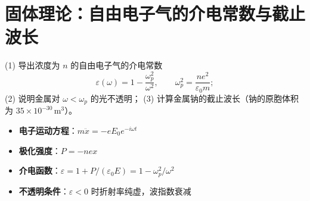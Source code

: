 \section{固体理论：自由电子气的介电常数与截止波长}
\label{sec:free-electron-dielectric}

\begin{modelbox}[题目：自由电子气介电函数与金属光学透明性]
(1) 导出浓度为 $n$ 的自由电子气的介电常数
\begin{equation}
\varepsilon(\omega)=1-\frac{\omega_p^2}{\omega^2},\qquad\omega_p^2=\frac{ne^2}{\varepsilon_0 m};
\end{equation}
(2) 说明金属对 $\omega<\omega_p$ 的光不透明；
(3) 计算金属钠的截止波长（钠的原胞体积为 $35\times10^{-30}\,\text{m}^3$）。
\end{modelbox}

\begin{tipbox}[考点快速分析]
\begin{itemize}
    \item \textbf{电子运动方程}：$m\ddot{x}=-eE_0e^{-i\omega t}$
    \item \textbf{极化强度}：$P=-nex$
    \item \textbf{介电函数}：$\varepsilon=1+P/(\varepsilon_0E)=1-\omega_p^2/\omega^2$
    \item \textbf{不透明条件}：$\varepsilon<0$ 时折射率纯虚，波指数衰减
\end{itemize}
\end{tipbox}

